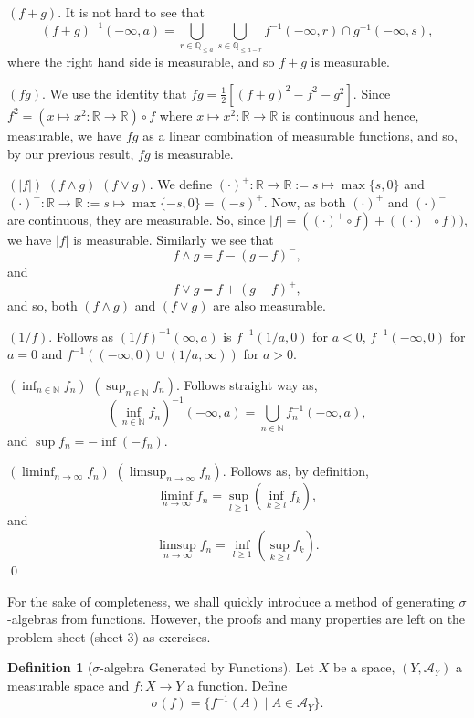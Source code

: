 \documentclass[
]{article}
\theoremstyle{definition}
\theoremstyle{definition}
\newtheorem{definition}{Definition}[section]
\begin{document}
\proof

\((f + g)\). It is not hard to see that
\[(f + g)^{-1}(- \infty, a) = \bigcup_{r \in \mathbb{Q}_{\le a}} 
    \bigcup_{s \in \mathbb{Q}_{\le a - r}} f^{-1} (-\infty, r) \cap g^{-1}(-\infty, s),\]
where the right hand side is measurable, and so \(f + g\) is measurable.

\((fg)\). We use the identity that
\(fg = \frac{1}{2}[(f + g)^2 - f^2 - g^2]\). Since
\(f^2 = (x \mapsto x^2 : \mathbb{R} \to \mathbb{R}) \circ f\) where
\(x \mapsto x^2 : \mathbb{R} \to \mathbb{R}\) is continuous and hence,
measurable, we have \(fg\) as a linear combination of measurable
functions, and so, by our previous result, \(fg\) is measurable.

\((|f|)\) \((f \wedge g)\) \((f \vee g)\). We define
\((\cdot)^+ : \mathbb{R} \to \mathbb{R} := s \mapsto \max\{s, 0\}\) and
\((\cdot)^- : \mathbb{R} \to \mathbb{R} := s \mapsto \max\{-s, 0\} = (-s)^+\).
Now, as both \((\cdot)^+\) and \((\cdot)^-\) are continuous, they are
measurable. So, since
\(|f| = ((\cdot)^+ \circ f) + ((\cdot)^- \circ f))\), we have \(|f|\) is
measurable. Similarly we see that \[f \wedge g = f - (g - f)^-,\] and
\[f \vee g = f + (g - f)^+,\] and so, both \((f \wedge g)\) and
\((f \vee g)\) are also measurable.

\((1 / f)\). Follows as \((1 / f)^{-1}(\infty, a)\) is
\(f^{-1}(1 / a, 0)\) for \(a < 0\), \(f^{-1}(- \infty, 0)\) for
\(a = 0\) and \(f^{-1}((-\infty, 0) \cup (1 / a, \infty))\) for
\(a > 0\).

\((\inf_{n \in \mathbb{N}} f_n)\) \((\sup_{n \in \mathbb{N}} f_n)\).
Follows straight way as,\\
\[(\inf_{n \in \mathbb{N}} f_n)^{-1}(-\infty, a) = 
    \bigcup_{n \in \mathbb{N}} f_n^{-1}(-\infty, a),\] and
\(\sup f_n = - \inf (- f_n)\).

\((\liminf_{n \to \infty} f_n)\) \((\limsup_{n \to \infty} f_n)\).
Follows as, by definition,
\[\liminf_{n \to \infty} f_n = \sup_{l \ge 1}\left(\inf_{k \ge l} f_k\right),\]
and
\[\limsup_{n \to \infty} f_n = \inf_{l \ge 1}\left(\sup_{k \ge l} f_k\right).\]
\qed

For the sake of completeness, we shall quickly introduce a method of
generating \(\sigma\)-algebras from functions. However, the proofs and
many properties are left on the problem sheet (sheet 3) as exercises.

\begin{definition}[\(\sigma\)-algebra Generated by Functions]
  Let \(X\) be a space, \((Y, \mathcal{A}_Y)\) a measurable space and 
  \(f : X \to Y\) a function. Define 
  \[\sigma(f) = \{f^{-1}(A) \mid A \in \mathcal{A}_Y\}.\]
\end{definition}
\end{document}
